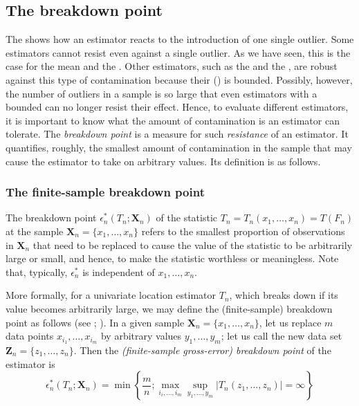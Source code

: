
\subsection{The breakdown point}
\label{subsec:theory:BP}

The  shows how an estimator reacts to the introduction
of one single outlier. Some estimators cannot resist even against a
single outlier. As we have seen, this is the case for the mean and the
. Other estimators, such as the  and
the , are robust against this type of
contamination because their  () is
bounded. Possibly, however, the number of outliers in a sample is so large that
even estimators with a bounded  can no longer resist their effect.
Hence, to evaluate different estimators, it is important to know what the
amount of contamination is an estimator can tolerate. The
\emph{breakdown point} is a measure for such \emph{resistance} of an estimator.
It quantifies, roughly, the smallest amount of contamination in the
sample that may cause the estimator to take on arbitrary values. Its definition
is as follows.

\subsubsection{The finite-sample breakdown point}

The breakdown point $\epsilon_n^*(T_n; \mathbf{X}_n)$ of the statistic
$T_n = T_n(x_1, \dots, x_n) = T(F_n)$ at the sample $\mathbf{X}_n 
= \{x_1, \dots, x_n\}$ refers to the smallest proportion of observations
in $\mathbf{X}_n$ that need to be replaced to cause the value of the
statistic to be arbitrarily large or small, and hence, to make the statistic
worthless or meaningless. Note that, typically, $\epsilon_n^*$ is
independent of $x_1, \dots, x_n$.

More formally, for a univariate location estimator $T_n$, which breaks down
if its value becomes arbitrarily large, we may define the (finite-sample)
breakdown point as follows (see \citealp{hampel:stahel:1982};
\citealp{donoho:huber:1983}). In a given sample $\mathbf{X}_n = \{x_1,
\dots, x_n\}$, let us replace $m$ data points $x_{i_1}, \dots, x_{i_{m}}$
by arbitrary values $y_1, \dots, y_{m}$; let us call the new data set        %
$\mathbf{Z}_n = \{z_1, \dots, z_n\}$. Then the \emph{(finite-sample
gross-error) breakdown point} of the estimator is%
\[
    \epsilon_n^{\ast}(T_n; \mathbf{X}_n) 
    = \min \left\{\frac{m}{n}; \max_{i_i, \dots, i_{m}} \sup_{y_1, \dots, y_{m}} 
      \left|T_n(z_1, \dots, z_n)\right| =\infty \right\}
\]

